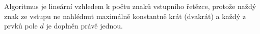 \documentclass[12pt,a4paper]{article}
\begin{document}
Algoritmus je lineární vzhledem k počtu znaků vstupního řetězce, protože naždý znak ze vstupu ne nahlédnut maximálně konstantně krát (dvakrát) a každý z prvků pole $d$ je doplněn právě jednou.








\end{document}
